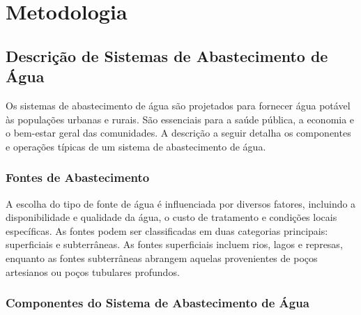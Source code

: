 \chapter{Metodologia}
\label{chap:metodologia}

\section{Descrição de Sistemas de Abastecimento de Água}

Os sistemas de abastecimento de água são projetados para fornecer água potável às populações urbanas e rurais. São essenciais para a saúde pública, a economia e o bem-estar geral das comunidades. A descrição a seguir detalha os componentes e operações típicas de um sistema de abastecimento de água.

\subsection*{Fontes de Abastecimento}

A escolha do tipo de fonte de água é influenciada por diversos fatores, incluindo a disponibilidade e qualidade da água, o custo de tratamento e condições locais específicas. As fontes podem ser classificadas em duas categorias principais: superficiais e subterrâneas. As fontes superficiais incluem rios, lagos e represas, enquanto as fontes subterrâneas abrangem aquelas provenientes de poços artesianos ou poços tubulares profundos.

\subsection*{Componentes do Sistema de Abastecimento de Água}


